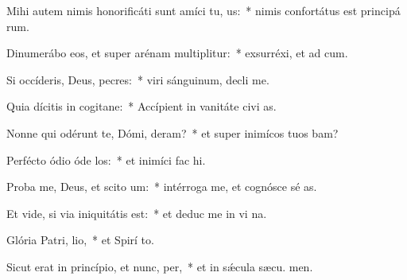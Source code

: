 \item Mihi autem nimis honorificáti sunt amíci tu, us:~* nimis confortátus est principá rum.
\item Dinumerábo eos, et super arénam multiplitur:~* exsurréxi, et ad  cum.
\item Si occíderis, Deus, pecres:~* viri sánguinum, decli  me.
\item Quia dícitis in cogitane:~* Accípient in vanitáte civi as.
\item Nonne qui odérunt te, Dómi, deram?~* et super inimícos tuos bam?
\item Perfécto ódio óde los:~* et inimíci fac  hi.
\item Proba me, Deus, et scito  um:~* intérroga me, et cognósce sé as.
\item Et vide, si via iniquitátis   est:~* et deduc me in vi na.
\item Glória Patri,  lio,~* et Spirí to.
\item Sicut erat in princípio, et nunc,  per,~* et in sǽcula sæcu. men.
